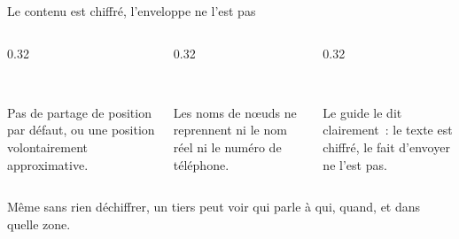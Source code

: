 \begin{frame}{Le contenu est chiffré, l'enveloppe ne l'est pas}
  \vspace{0.15cm}
  \begin{columns}[T]
    \begin{column}{0.32\textwidth}
      \begin{carte}[height=2.05cm,valign=top,colback=insarose!45]
        \raggedright{}\\[1pt]
        {\footnotesize Pas de partage de position par défaut, ou une position volontairement approximative.\par}
      \end{carte}
    \end{column}
    \begin{column}{0.32\textwidth}
      \begin{carte}[height=2.05cm,valign=top,colback=insarose!45]
        \raggedright{}\\[1pt]
        {\footnotesize Les noms de nœuds ne reprennent ni le nom réel ni le numéro de téléphone.\par}
      \end{carte}
    \end{column}
    \begin{column}{0.32\textwidth}
      \begin{carte}[height=2.05cm,valign=top,colback=insarose!45]
        \raggedright{}\\[1pt]
        {\footnotesize Le guide le dit clairement~: le texte est chiffré, le fait d'envoyer ne l'est pas.\par}
      \end{carte}
    \end{column}
  \end{columns}
  \vspace{0.15cm}
  \begin{pcompact}\centering\footnotesize
    Même sans rien déchiffrer, un tiers peut voir qui parle à qui, quand, et dans quelle zone.
  \end{pcompact}
\end{frame}

